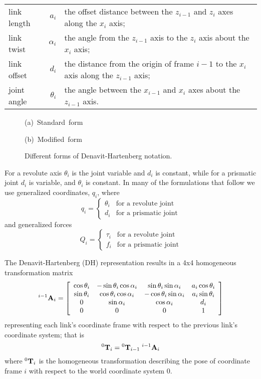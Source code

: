 \documentclass{article}
\newlength{\bigwidth}           %
\begin{document}
\begin{center}
\begin{tabular}{lrp{8cm}}
link length & $a_i$ & the offset distance between the $z_{i-1}$ and $z_i$ axes
along the $x_i$ axis;\\
link twist & $\alpha_i$ & the angle from the $z_{i-1}$ axis to the $z_i$ axis about the
$x_i$ axis;\\
link offset & $d_i$ & the distance from the origin of frame $i-1$ to the
$x_i$ axis along the $z_{i-1}$ axis;\\
joint angle & $\theta_i$ & the angle between the $x_{i-1}$ and
$x_i$ axes about the $z_{i-1}$ axis.
\end{tabular}
\end{center}

\begin{figure}
\centerline{}
\centerline{\mbox{(a) Standard form}}
\centerline{}
\centerline{\mbox{(b) Modified form}}
\caption{Different forms of Denavit-Hartenberg notation.}
\label{fig:kinematics}
\end{figure}

For a revolute axis $\theta_i$ is the
joint variable and $d_i$ is constant, while for a prismatic joint $d_i$ is variable,
and $\theta_i$ is constant.  In many of the formulations that follow we use
generalized coordinates, $q_i$, where
\[
q_i = \left \{ \begin{array}{ll}
	\theta_i & \mbox{for a revolute joint} \\
	d_i & \mbox{for a prismatic joint}
	\end{array} \right .
\]
and generalized forces
\[
Q_i = \left \{ \begin{array}{ll}
	\tau_i & \mbox{for a revolute joint} \\
	f_i & \mbox{for a prismatic joint}
	\end{array} \right .
\]

The Denavit-Hartenberg (DH) representation results
in a 4x4 homogeneous transformation matrix
\begin{equation}
{}^{i-1} {\bf A}_i = \left [ \begin{array}{cccc}
	\cos \theta_i & -\sin \theta_i \cos \alpha_i & \sin \theta_i \sin
	\alpha_i & a_i \cos \theta_i\\
	\sin \theta_i & \cos \theta_i \cos \alpha_i & -\cos \theta_i \sin
	\alpha_i & a_i \sin \theta_i\\
	0 & \sin \alpha_i & \cos \alpha_i & d_i\\
0 & 0 & 0 & 1
	\end{array} \right ]    \label{eq:Amatrix}
\end{equation}
representing each link's
coordinate frame with respect to the previous link's coordinate system; that is
\begin{equation}
{}^0 {\bf T}_i = {}^0 {\bf T}_{i-1} \;{}^{i-1} {\bf A}_i   \label{eq:joint-xform}
\end{equation}
where ${}^0 {\bf T}_i$ is the homogeneous transformation describing the pose
of coordinate frame $i$ with respect to the world coordinate system $0$.
\end{document}
